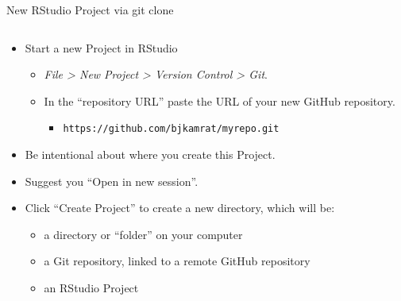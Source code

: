 \documentclass[
  ignorenonframetext,
]{beamer}
\providecommand{\tightlist}{%
  \setlength{\itemsep}{0pt}\setlength{\parskip}{0pt}}
\begin{document}
\begin{frame}[fragile]{New RStudio Project via git clone}
\protect\hypertarget{new-rstudio-project-via-git-clone}{}

\begin{columns}[T]
\begin{column}{0.48\textwidth}
\begin{itemize}
\tightlist
\item
  Start a new Project in RStudio

  \begin{itemize}
  \tightlist
  \item
    \emph{File \textgreater{} New Project \textgreater{} Version Control
    \textgreater{} Git}.
  \item
    In the ``repository URL'' paste the URL of your new GitHub
    repository.

    \begin{itemize}
    \tightlist
    \item
      \texttt{https://github.com/bjkamrat/myrepo.git}
    \end{itemize}
  \end{itemize}
\item
  Be intentional about where you create this Project.
\item
  Suggest you ``Open in new session''.
\item
  Click ``Create Project'' to create a new directory, which will be:

  \begin{itemize}
  \tightlist
  \item
    a directory or ``folder'' on your computer
  \item
    a Git repository, linked to a remote GitHub repository
  \item
    an RStudio Project
  \end{itemize}
\end{itemize}
\end{column}


\end{columns}
\end{frame}
\end{document}
